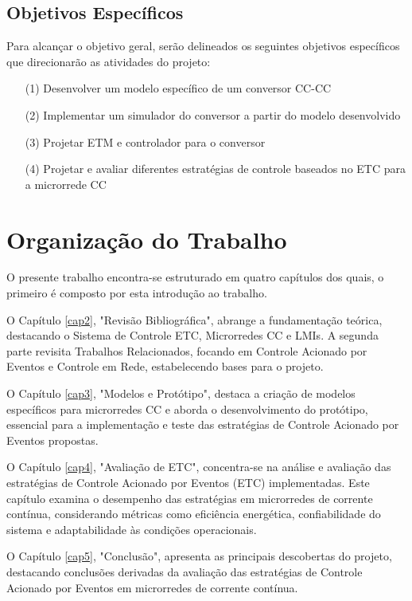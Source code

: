 \subsection{Objetivos Específicos}
Para alcançar o objetivo geral, serão delineados os seguintes objetivos específicos que direcionarão as atividades do projeto:

\begin{enumerate}
  \item[(1)] Desenvolver um modelo específico de um conversor CC-CC
  \item[(2)] Implementar um simulador do conversor a partir do modelo desenvolvido
  \item[(3)] Projetar ETM e controlador para o conversor
  \item[(4)] Projetar e avaliar diferentes estratégias de controle baseados no ETC para a microrrede CC
\end{enumerate}

\section{Organização do Trabalho}

O presente trabalho encontra-se estruturado em quatro capítulos dos quais, o primeiro é composto por esta introdução ao trabalho.

O Capítulo \ref{cap2}, "Revisão Bibliográfica", abrange a fundamentação teórica, destacando o Sistema de Controle ETC, Microrredes CC e LMIs. A segunda parte revisita Trabalhos Relacionados, focando em Controle Acionado por Eventos e Controle em Rede, estabelecendo bases para o projeto.

O Capítulo \ref{cap3}, "Modelos e Protótipo", destaca a criação de modelos específicos para microrredes CC e aborda o desenvolvimento do protótipo, essencial para a implementação e teste das estratégias de Controle Acionado por Eventos propostas.

O Capítulo \ref{cap4}, "Avaliação de ETC", concentra-se na análise e avaliação das estratégias de Controle Acionado por Eventos (ETC) implementadas. Este capítulo examina o desempenho das estratégias em microrredes de corrente contínua, considerando métricas como eficiência energética, confiabilidade do sistema e adaptabilidade às condições operacionais.

O Capítulo \ref{cap5}, "Conclusão", apresenta as principais descobertas do projeto, destacando conclusões derivadas da avaliação das estratégias de Controle Acionado por Eventos em microrredes de corrente contínua.

